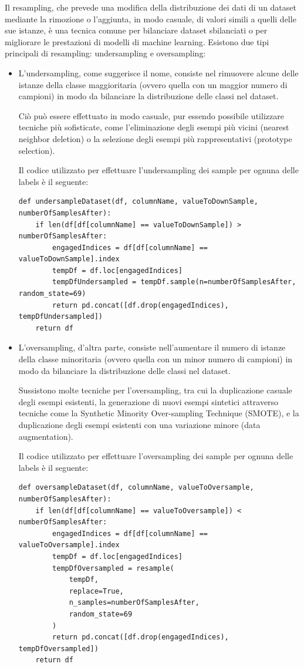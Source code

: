 Il resampling, che prevede una modifica  della distribuzione dei dati di un dataset mediante la rimozione o l’aggiunta, in modo casuale, di valori simili a quelli delle sue istanze, è una tecnica comune per bilanciare dataset sbilanciati o per migliorare le prestazioni di modelli di machine learning. Esistono due tipi principali di resampling: undersampling e oversampling:
\begin{itemize}
    \item L'undersampling, come suggerisce il nome, consiste nel rimuovere alcune delle istanze della classe maggioritaria (ovvero quella con un maggior numero di campioni) in modo da bilanciare la distribuzione delle classi nel dataset. 
    
Ciò può essere effettuato in modo casuale, pur essendo possibile utilizzare tecniche più sofisticate, come l'eliminazione degli esempi più vicini (nearest neighbor deletion) o la selezione degli esempi più rappresentativi (prototype selection). 

Il codice utilizzato per effettuare l’undersampling dei sample per ognuna delle labels è il seguente:
\begin{verbatim}
def undersampleDataset(df, columnName, valueToDownSample, numberOfSamplesAfter):
    if len(df[df[columnName] == valueToDownSample]) > numberOfSamplesAfter:
        engagedIndices = df[df[columnName] == valueToDownSample].index
        tempDf = df.loc[engagedIndices]
        tempDfUndersampled = tempDf.sample(n=numberOfSamplesAfter, random_state=69)
        return pd.concat([df.drop(engagedIndices), tempDfUndersampled])
    return df
\end{verbatim}
\item L'oversampling, d'altra parte, consiste nell'aumentare il numero di istanze della classe minoritaria (ovvero quella con un minor numero di campioni) in modo da bilanciare la distribuzione delle classi nel dataset.

Sussistono molte tecniche per l'oversampling, tra cui la duplicazione casuale degli esempi esistenti, la generazione di nuovi esempi sintetici attraverso tecniche come la Synthetic Minority Over-sampling Technique (SMOTE), e la duplicazione degli esempi esistenti con una variazione minore (data augmentation). 

Il codice utilizzato per effettuare l’oversampling dei sample per ognuna delle labels è il seguente:
\begin{verbatim}
def oversampleDataset(df, columnName, valueToOversample, numberOfSamplesAfter):
    if len(df[df[columnName] == valueToOversample]) < numberOfSamplesAfter:
        engagedIndices = df[df[columnName] == valueToOversample].index
        tempDf = df.loc[engagedIndices]
        tempDfOversampled = resample(
            tempDf, 
            replace=True, 
            n_samples=numberOfSamplesAfter, 
            random_state=69
        )
        return pd.concat([df.drop(engagedIndices), tempDfOversampled])
    return df
\end{verbatim}

\end{itemize}

